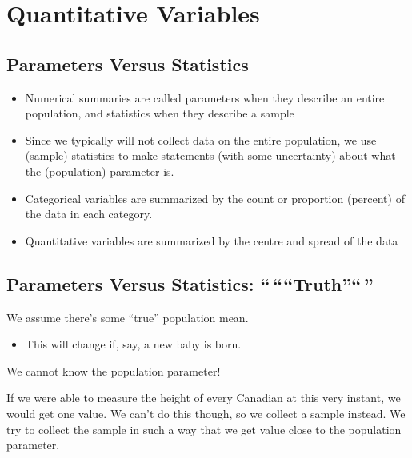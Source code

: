 \documentclass[
  letterpaper,
  DIV=11,
  numbers=noendperiod]{scrreprt}
\providecommand{\tightlist}{%
  \setlength{\itemsep}{0pt}\setlength{\parskip}{0pt}}\usepackage{longtable,booktabs,array}
\begin{document}
\hypertarget{quantitative-variables-1}{%
\chapter{Quantitative Variables}\label{quantitative-variables-1}}

\hypertarget{parameters-versus-statistics}{%
\section{Parameters Versus
Statistics}\label{parameters-versus-statistics}}

\begin{itemize}
\tightlist
\item
  Numerical summaries are called parameters when they describe an entire
  population, and statistics when they describe a sample\lspace
\item
  Since we typically will not collect data on the entire population, we
  use (sample) statistics to make statements (with some uncertainty)
  about what the (population) parameter is.\lspace
\item
  Categorical variables are summarized by the count or proportion
  (percent) of the data in each category.\lspace
\item
  Quantitative variables are summarized by the centre and spread of the
  data
\end{itemize}

\hypertarget{parameters-versus-statistics-truth}{%
\section{\texorpdfstring{Parameters Versus Statistics:
``\,````Truth''``\,''}{Parameters Versus Statistics: ``\,``\,``Truth''\,``\,''}}\label{parameters-versus-statistics-truth}}

We assume there's some ``true'' population mean.

\begin{itemize}
\tightlist
\item
  This will change if, say, a new baby is born.\lspace
\end{itemize}

\pspace

We cannot know the population parameter!

If we were able to measure the height of every Canadian at this very
instant, we would get one value. We can't do this though, so we collect
a sample instead. We try to collect the sample in such a way that we get
value close to the population parameter.
\end{document}
